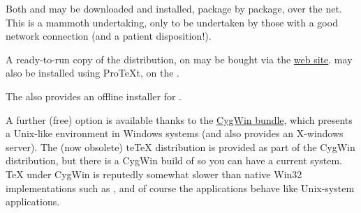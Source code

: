 Both \miktex{} and \texlive{} may be downloaded and installed, package
by package, over the net.  This is a mammoth undertaking, only to be
undertaken by those with a good network connection (and a patient
disposition!).

A ready-to-run copy of the \miktex{} distribution,
on  may be bought via the %
\href{http://www.miktex.org/cd/}{\miktex{} web site}.  \miktex{} may
also be installed using Pro\TeX{}t, on the %
.

The  also provides an
offline installer for \texlive{}.

%
%
%
%
  
A further (free) option is available thanks to the
\href{http://www.cygwin.com}{CygWin bundle}, which presents a
Unix-like environment in Windows systems (and also provides an
X-windows server).  The (now obsolete) te\TeX{} distribution is
provided as part of the CygWin distribution, but there is a CygWin
build of \texlive{} so you can have a current \tex{} system.  \TeX{}
under CygWin is reputedly somewhat slower than native Win32
implementations such as \miktex{}, and of course the \tex{}
applications behave like Unix-system applications.

